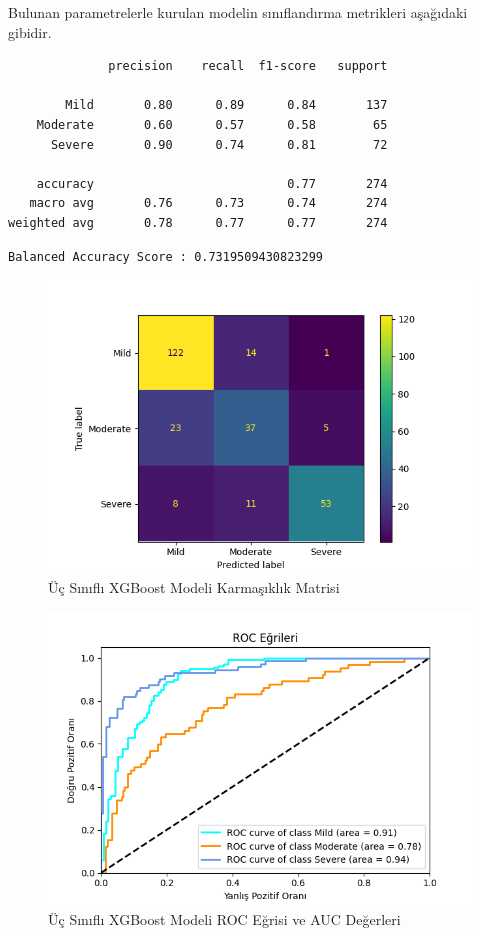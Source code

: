 \documentclass[12pt,twoside]{deuthesis}
\begin{document}
Bulunan parametrelerle kurulan modelin sınıflandırma metrikleri aşağıdaki gibidir.
\begin{verbatim}
              precision    recall  f1-score   support

        Mild       0.80      0.89      0.84       137
    Moderate       0.60      0.57      0.58        65
      Severe       0.90      0.74      0.81        72

    accuracy                           0.77       274
   macro avg       0.76      0.73      0.74       274
weighted avg       0.78      0.77      0.77       274
\end{verbatim}
\begin{verbatim}
Balanced Accuracy Score : 0.7319509430823299
\end{verbatim}
\begin{figure}

{\centering \includegraphics[width=1.05\linewidth,height=0.6\textheight]{figure/xgb_conf} 

}

\caption{Üç Sınıflı XGBoost Modeli Karmaşıklık Matrisi}\label{fig:unnamed-chunk-42}
\end{figure}
\begin{figure}

{\centering \includegraphics[width=1.05\linewidth,height=0.6\textheight]{figure/roc_curve_XGBClassifier} 

}

\caption{Üç Sınıflı XGBoost Modeli ROC Eğrisi ve AUC Değerleri}\label{fig:unnamed-chunk-43}
\end{figure}
\end{document}
